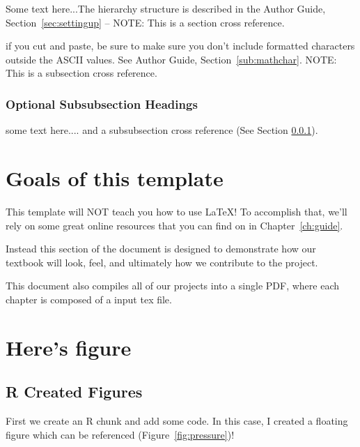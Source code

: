 \documentclass{book}\usepackage{knitr}
\begin{document}
\begin{knitrout}
\begin{kframe}
Some text here...The hierarchy structure is described in the Author Guide, Section~\ref{sec:settingup} -- NOTE: This is a section cross reference.

if you cut and paste, be sure to make sure you don't include formatted characters outside the ASCII values. See Author Guide, Section~\ref{sub:mathchar}. NOTE: This is a subsection cross reference.


\subsubsection{Optional Subsubsection Headings}\label{subsub:optionalsubsub} %

some text here.... and a subsubsection cross reference (See Section \ref{subsub:optionalsubsub}).

\section{Goals of this template}

This template will NOT teach you how to use \LaTeX! To accomplish that, we'll rely on some great online resources that you can find on in Chapter~\ref{ch:guide}. 

Instead this section of the document is designed to demonstrate how our textbook will look, feel, and ultimately how we contribute to the project.

This document also compiles all of our projects into a single PDF, where each chapter is composed of a input tex file.

\section{Here's figure}

\subsection{R Created Figures}

First we create an R chunk and add some code. In this case, I created a floating figure which can be referenced (Figure~\ref{fig:pressure})!  


\end{kframe}
\end{knitrout}
\end{document}
